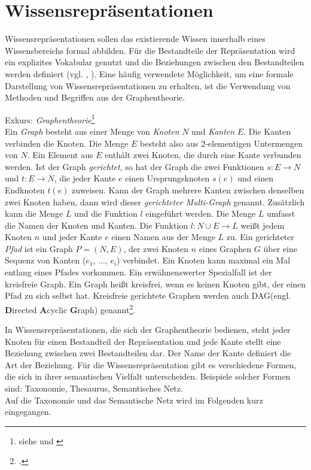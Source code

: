 \section{Wissensrepräsentationen}
\label{Ch:Vorbetrachtung:Sec:Wissensrepräsentaionen}
Wissensrepräsentationen sollen das existierende Wissen innerhalb eines Wissensbereichs formal abbilden. Für die Bestandteile der Repräsentation wird ein explizites Vokabular genutzt und die Beziehungen zwischen den Bestandteilen werden definiert (vgl. \cite[S. 60]{BEN16}, \cite[S. 1]{SEB04}). Eine häufig verwendete Möglichkeit, um eine formale Darstellung von Wissensrepräsentationen zu erhalten, ist die Verwendung von Methoden und Begriffen aus der Graphentheorie.

Exkurs: \textit{Graphentheorie}\footnote{siehe \cite[S.29]{STU09} und \cite[Abschnitte 1.1, 1.3 und 1.10]{DIE20}}\\
Ein \textit{Graph} besteht aus einer Menge von \textit{Knoten} $N$ und \textit{Kanten} $E$. Die Kanten verbinden die Knoten. Die Menge $E$ besteht also aus 2-elementigen Untermengen von $N$. Ein Element aus $E$ enthält zwei Knoten, die durch eine Kante verbunden werden. Ist der Graph \textit{gerichtet}, so hat der Graph die zwei Funktionen $s:E\rightarrow N$ und $t:E\rightarrow N$, die jeder Kante $e$ einen Ursprungsknoten $s(e)$ und einen Endknoten $t(e)$ zuweisen. Kann der Graph mehrere Kanten zwischen denselben zwei Knoten haben, dann wird dieser \textit{gerichteter Multi-Graph} genannt. Zusätzlich kann die Menge $L$ und die Funktion $l$ eingeführt werden. Die Menge $L$ umfasst die Namen der Knoten und Kanten. Die Funktion $l:N\cup E\rightarrow L$ weißt jedem Knoten $n$ und jeder Kante $e$ einen Namen aus der Menge $L$ zu.
Ein gerichteter \textit{Pfad} ist ein Graph $P = (N, E)$, der zwei Knoten $n$ eines Graphen $G$ über eine Sequenz von Kanten ($e_1$, $\dots$, $e_i$) verbindet. Ein Knoten kann maximal ein Mal entlang eines Pfades vorkommen. 
Ein erwähnenswerter Spezialfall ist der kreisfreie Graph. \glqq Ein Graph heißt kreisfrei, wenn es keinen Knoten gibt, der einen Pfad zu sich selbst hat. Kreisfreie gerichtete Graphen werden auch DAG(engl. \textbf{D}irected \textbf{A}cyclic \textbf{G}raph) genannt\grqq\footcite{STU09}. 

In Wissensrepräsentationen, die sich der Graphentheorie bedienen, steht jeder Knoten für einen Bestandteil der Repräsentation und jede Kante stellt eine Beziehung zwischen zwei Bestandteilen dar. Der Name der Kante definiert die Art der Beziehung. Für die Wissensrepräsentation gibt es verschiedene Formen, die sich in ihrer semantischen Vielfalt unterscheiden. Beispiele solcher Formen sind: Taxonomie, Thesaurus, Semantisches Netz.\\ 
Auf die Taxonomie und das Semantische Netz wird im Folgenden kurz eingegangen.
 
